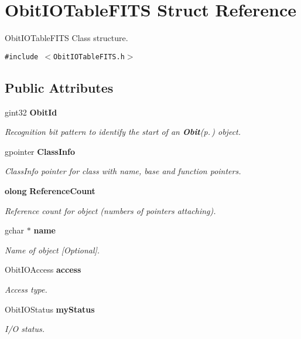 \section{Obit\-IOTable\-FITS Struct Reference}
\label{structObitIOTableFITS}
Obit\-IOTable\-FITS Class structure.  


{\tt \#include $<$Obit\-IOTable\-FITS.h$>$}

\subsection*{Public Attributes}
\begin{CompactItemize}
\item 
gint32 {\bf Obit\-Id}
\begin{CompactList}\small\item\em Recognition bit pattern to identify the start of an {\bf Obit}{\rm (p.\,\pageref{structObit})} object. \item\end{CompactList}\item 
gpointer {\bf Class\-Info}
\begin{CompactList}\small\item\em Class\-Info pointer for class with name, base and function pointers. \item\end{CompactList}\item 
{\bf olong} {\bf Reference\-Count}
\begin{CompactList}\small\item\em Reference count for object (numbers of pointers attaching). \item\end{CompactList}\item 
gchar $\ast$ {\bf name}
\begin{CompactList}\small\item\em Name of object [Optional]. \item\end{CompactList}\item 
Obit\-IOAccess {\bf access}
\begin{CompactList}\small\item\em Access type. \item\end{CompactList}\item 
Obit\-IOStatus {\bf my\-Status}
\begin{CompactList}\small\item\em I/O status. \item\end{CompactList}\item 

\end{CompactItemize}
